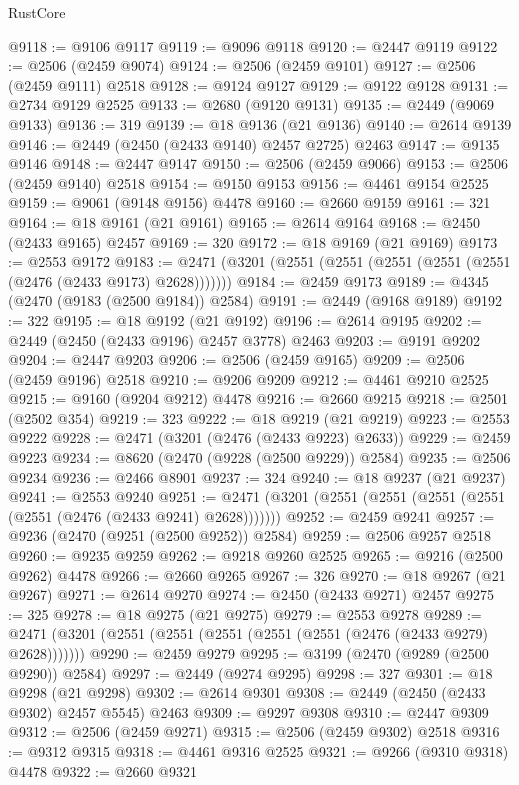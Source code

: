 \begin{lexlean}{RustCore}
\begin{coremodule}
@9118 := @9106 @9117
@9119 := @9096 @9118
@9120 := @2447 @9119
@9122 := @2506 (@2459 @9074)
@9124 := @2506 (@2459 @9101)
@9127 := @2506 (@2459 @9111) @2518
@9128 := @9124 @9127
@9129 := @9122 @9128
@9131 := @2734 @9129 @2525
@9133 := @2680 (@9120 @9131)
@9135 := @2449 (@9069 @9133)
@9136 := 319
@9139 := @18 @9136 (@21 @9136)
@9140 := @2614 @9139
@9146 := @2449 (@2450 (@2433 @9140) @2457 @2725) @2463
@9147 := @9135 @9146
@9148 := @2447 @9147
@9150 := @2506 (@2459 @9066)
@9153 := @2506 (@2459 @9140) @2518
@9154 := @9150 @9153
@9156 := @4461 @9154 @2525
@9159 := @9061 (@9148 @9156) @4478
@9160 := @2660 @9159
@9161 := 321
@9164 := @18 @9161 (@21 @9161)
@9165 := @2614 @9164
@9168 := @2450 (@2433 @9165) @2457
@9169 := 320
@9172 := @18 @9169 (@21 @9169)
@9173 := @2553 @9172
@9183 := @2471 (@3201 (@2551 (@2551 (@2551 (@2551 (@2551 (@2476 (@2433 @9173) @2628)))))))
@9184 := @2459 @9173
@9189 := @4345 (@2470 (@9183 (@2500 @9184)) @2584)
@9191 := @2449 (@9168 @9189)
@9192 := 322
@9195 := @18 @9192 (@21 @9192)
@9196 := @2614 @9195
@9202 := @2449 (@2450 (@2433 @9196) @2457 @3778) @2463
@9203 := @9191 @9202
@9204 := @2447 @9203
@9206 := @2506 (@2459 @9165)
@9209 := @2506 (@2459 @9196) @2518
@9210 := @9206 @9209
@9212 := @4461 @9210 @2525
@9215 := @9160 (@9204 @9212) @4478
@9216 := @2660 @9215
@9218 := @2501 (@2502 @354)
@9219 := 323
@9222 := @18 @9219 (@21 @9219)
@9223 := @2553 @9222
@9228 := @2471 (@3201 (@2476 (@2433 @9223) @2633))
@9229 := @2459 @9223
@9234 := @8620 (@2470 (@9228 (@2500 @9229)) @2584)
@9235 := @2506 @9234
@9236 := @2466 @8901
@9237 := 324
@9240 := @18 @9237 (@21 @9237)
@9241 := @2553 @9240
@9251 := @2471 (@3201 (@2551 (@2551 (@2551 (@2551 (@2551 (@2476 (@2433 @9241) @2628)))))))
@9252 := @2459 @9241
@9257 := @9236 (@2470 (@9251 (@2500 @9252)) @2584)
@9259 := @2506 @9257 @2518
@9260 := @9235 @9259
@9262 := @9218 @9260 @2525
@9265 := @9216 (@2500 @9262) @4478
@9266 := @2660 @9265
@9267 := 326
@9270 := @18 @9267 (@21 @9267)
@9271 := @2614 @9270
@9274 := @2450 (@2433 @9271) @2457
@9275 := 325
@9278 := @18 @9275 (@21 @9275)
@9279 := @2553 @9278
@9289 := @2471 (@3201 (@2551 (@2551 (@2551 (@2551 (@2551 (@2476 (@2433 @9279) @2628)))))))
@9290 := @2459 @9279
@9295 := @3199 (@2470 (@9289 (@2500 @9290)) @2584)
@9297 := @2449 (@9274 @9295)
@9298 := 327
@9301 := @18 @9298 (@21 @9298)
@9302 := @2614 @9301
@9308 := @2449 (@2450 (@2433 @9302) @2457 @5545) @2463
@9309 := @9297 @9308
@9310 := @2447 @9309
@9312 := @2506 (@2459 @9271)
@9315 := @2506 (@2459 @9302) @2518
@9316 := @9312 @9315
@9318 := @4461 @9316 @2525
@9321 := @9266 (@9310 @9318) @4478
@9322 := @2660 @9321

\end{coremodule}
\end{lexlean}
